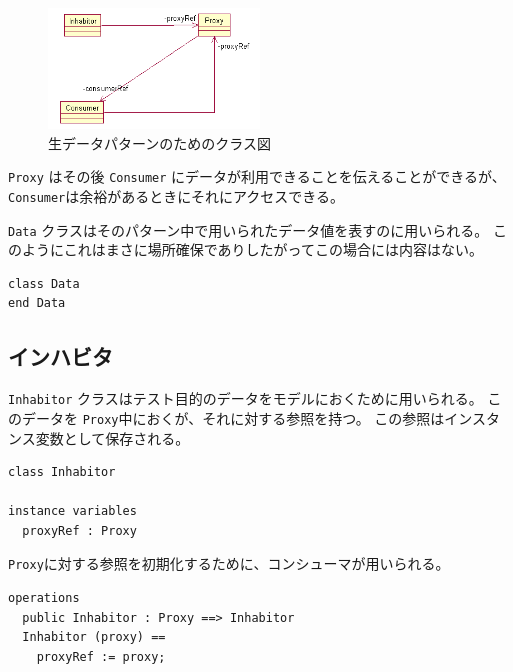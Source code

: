 \documentclass[\pformat,12pt]{jreport}
\begin{document}
\begin{figure}
\begin{center}
\includegraphics[width=0.5\textwidth]{freshdata}
\end{center}
\caption{生データパターンのためのクラス図\label{fig:freshdata}}
\end{figure}

 \texttt{Proxy} はその後 \texttt{Consumer} にデータが利用できることを伝えることができるが、 \texttt{Consumer}は余裕があるときにそれにアクセスできる。

\texttt{Data} クラスはそのパターン中で用いられたデータ値を表すのに用いられる。
このようにこれはまさに場所確保でありしたがってこの場合には内容はない。

\begin{lstlisting}
class Data
end Data
\end{lstlisting}

\subsection{インハビタ}

 \texttt{Inhabitor} クラスはテスト目的のデータをモデルにおくために用いられる。
このデータを \texttt{Proxy}中におくが、それに対する参照を持つ。
この参照はインスタンス変数として保存される。

\begin{lstlisting}
class Inhabitor

instance variables
  proxyRef : Proxy
\end{lstlisting}

\texttt{Proxy}に対する参照を初期化するために、コンシューマが用いられる。

\begin{lstlisting}
operations
  public Inhabitor : Proxy ==> Inhabitor
  Inhabitor (proxy) ==
    proxyRef := proxy;
\end{lstlisting}
\end{document}
